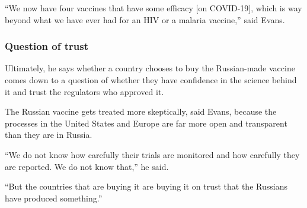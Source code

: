 \enquote{We now have four vaccines that have some efficacy [on COVID-19], which is way
beyond what we have ever had for an HIV or a malaria vaccine,} said Evans.

\subsubsection{Question of trust}

Ultimately, he says whether a country chooses to buy the Russian-made vaccine
comes down to a question of whether they have confidence in the science behind
it and trust the regulators who approved it.

The Russian vaccine gets treated more skeptically, said Evans, because the
processes in the United States and Europe are far more open and transparent
than they are in Russia.

\enquote{We do not know how carefully their trials are monitored and how carefully they
are reported. We do not know that,} he said.  

\enquote{But the countries that are buying it are buying it on trust that the Russians
have produced something.}
